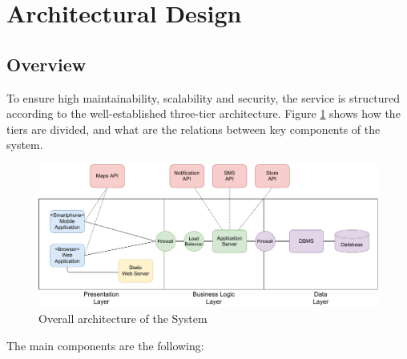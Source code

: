 
\section{Architectural Design}\label{ch:2}

\subsection{Overview}
To ensure high maintainability, scalability and security, the service is structured according to the well-established three-tier architecture.
Figure \ref{fig:overview-architecture} shows how the tiers are divided, and what are the relations between key components of the system.

\begin{figure}[H]
    \includegraphics[width=\linewidth]{images/draw.io/overview_architecture.pdf}
    \caption{Overall architecture of the System}
    \label{fig:overview-architecture}
\end{figure}

The main components are the following:

